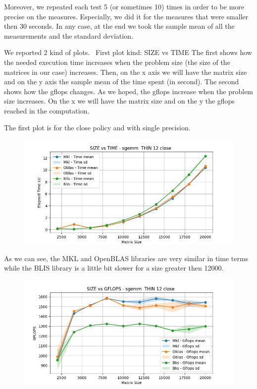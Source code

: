 \documentclass{article}
\begin{document}
Moreover, we repeated each test 5 (or sometimes 10) times in order to be more precise on the measures. Especially, we did it for the measures that were smaller then 30 seconds. 
In any case, at the end we took the sample mean of all the measurements and the standard deviation.

We reported 2 kind of plots. \
First plot kind: SIZE vs TIME
The first shows how the needed execution time increases when the problem size (the size of the matrices in our case) increases.
Then, on the x axis we will have the matrix size and on the y axis the sample mean of the time spent (in second).
The second shows how the gflops changes. As we hoped, the gflops increase when the problem size increases. On the x we will have the matrix size and on the y the gflops reached in the computation.

The first plot is for the close policy and with single precision.
\begin{figure}[H]
    \centering
    \includegraphics[width=\textwidth]{THIN 12/sgemm__THIN_12_close_time.png}
\end{figure}

As we can see, the MKL and OpenBLAS libraries are very similar in time terms while the BLIS library is a little bit slower for a size greater then 12000.

\begin{figure}[H]
    \centering
    \includegraphics[width=\textwidth]{THIN 12/sgemm__THIN_12_close_gflops.png}
\end{figure}
\end{document}
